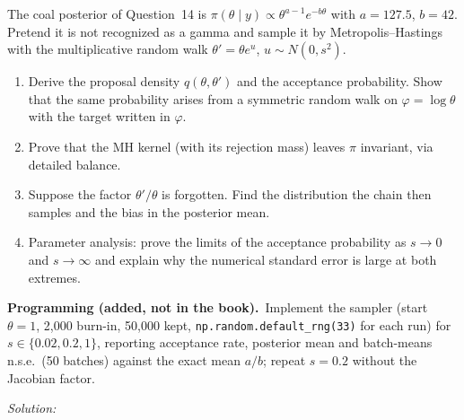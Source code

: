 \documentclass[11pt,a4paper]{article}
\newif\ifsolucoes
\newcommand{\espacoresol}{4.5cm}   %
\numberwithin{equation}{questao}   %
\newcommand{\programacao}{\par\smallskip\noindent\textbf{Programming (added, not in the book).}~}
\newcommand{\resolespaco}{\ifsolucoes\else\par\textit{Solution:}\vspace{\espacoresol}\par\fi}
\newcommand{\1}{\mathbf{1}}
\begin{document}
The coal posterior of Question~14 is $\pi(\theta\mid y)\propto\theta^{a-1}e^{-b\theta}$ with $a=127.5$,
$b=42$. Pretend it is not recognized as a gamma and sample it by Metropolis--Hastings with the
multiplicative random walk $\theta'=\theta e^{u}$, $u\sim N(0,s^2)$.
\begin{enumerate}[label=\textbf{(\alph*)},leftmargin=2.4em]
\item Derive the proposal density $q(\theta,\theta')$ and the acceptance probability. Show that the
same probability arises from a symmetric random walk on $\varphi=\log\theta$ with the target written
in $\varphi$.
\item Prove that the MH kernel (with its rejection mass) leaves $\pi$ invariant, via detailed balance.
\item Suppose the factor $\theta'/\theta$ is forgotten. Find the distribution the chain then samples and
the bias in the posterior mean.
\item Parameter analysis: prove the limits of the acceptance probability as $s\to0$ and $s\to\infty$
and explain why the numerical standard error is large at both extremes.
\end{enumerate}
\programacao Implement the sampler (start $\theta=1$, 2{,}000 burn-in, 50{,}000 kept,
\texttt{np.random.default\_rng(33)} for each run) for $s\in\{0.02,0.2,1\}$, reporting acceptance
rate, posterior mean and batch-means n.s.e.\ (50 batches) against the exact mean $a/b$; repeat
$s=0.2$ without the Jacobian factor.
\resolespaco
\end{document}
